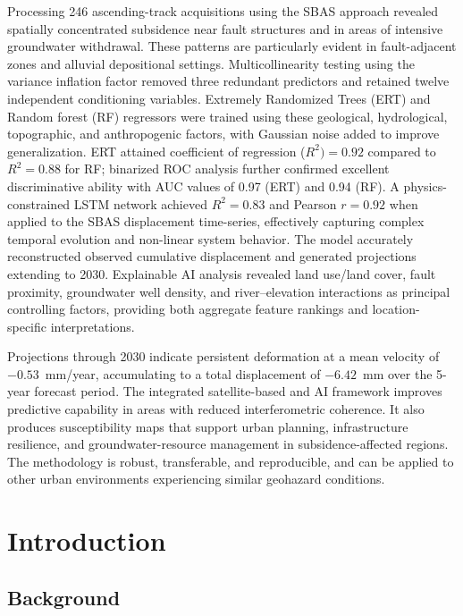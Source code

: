 \documentclass[oneside,doublespacing,flushright]{lsuthesis}
\begin{document}
Processing 246 ascending-track acquisitions using the SBAS approach revealed spatially concentrated subsidence near fault structures and in areas of intensive groundwater withdrawal. 
These patterns are particularly evident in fault-adjacent zones and alluvial depositional settings. Multicollinearity testing using the variance inflation factor removed three redundant 
predictors and retained twelve independent conditioning variables. Extremely Randomized Trees (ERT) and 
Random forest (RF) regressors were trained using these geological, hydrological, topographic, and anthropogenic factors, with Gaussian noise added to improve generalization. 
ERT attained coefficient of regression ($R^2) = 0.92$ compared to $R^2 = 0.88$ for RF; binarized ROC analysis further confirmed 
excellent discriminative ability with AUC values of 0.97 (ERT) and 0.94 (RF). A physics-constrained LSTM network achieved $R^2 = 0.83$ and Pearson $r = 0.92$ when applied to the 
SBAS displacement time-series, effectively capturing complex temporal evolution and non-linear system behavior. The model accurately reconstructed observed cumulative displacement and 
generated projections extending to 2030. Explainable AI analysis revealed land use/land cover, fault proximity, groundwater well density, and river--elevation 
interactions as principal controlling factors, providing both aggregate feature rankings and location-specific interpretations.

Projections through 2030 indicate persistent deformation at a mean velocity of $-0.53$~mm/year, accumulating to a total displacement of $-6.42$~mm over the 5-year forecast period.
The integrated satellite-based and AI framework improves predictive capability in areas with reduced interferometric coherence. It also produces susceptibility maps that support urban planning, 
infrastructure resilience, and groundwater-resource management in subsidence-affected regions. 
The methodology is robust, transferable, and reproducible, and can be applied to other urban environments experiencing similar geohazard conditions.
\mainmatter

\chapter{Introduction}
\section{Background}
\end{document}
